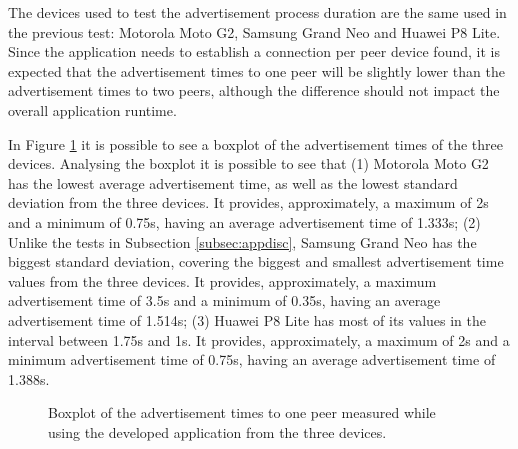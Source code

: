 The devices used to test the advertisement process duration are the same used in the previous test: Motorola Moto G2, Samsung Grand Neo and Huawei P8 Lite. Since the application needs to establish a connection per peer device found, it is expected that the advertisement times to one peer will be slightly lower than the advertisement times to two peers, although the difference should not impact the overall application runtime.

In Figure \ref{fig:adv1} it is possible to see a boxplot of the advertisement times of the three devices. Analysing the boxplot it is possible to see that (1) Motorola Moto G2 has the lowest average advertisement time, as well as the lowest standard deviation from the three devices. It provides, approximately, a maximum of 2s and a minimum of 0.75s, having an average advertisement time of 1.333s; (2) Unlike the tests in Subsection \ref{subsec:appdisc}, Samsung Grand Neo has the biggest standard deviation, covering the biggest and smallest advertisement time values from the three devices. It provides, approximately, a maximum advertisement time of 3.5s and a minimum of 0.35s, having an average advertisement time of 1.514s; (3) Huawei P8 Lite has most of its values in the interval between 1.75s and 1s. It provides, approximately, a maximum of 2s and a minimum advertisement time of 0.75s, having an average advertisement time of 1.388s.

\begin{figure}[ht]
	\noindent{}
	\caption{\label{fig:adv1} Boxplot of the advertisement times to one peer measured while using the developed application from the three devices.}
\end{figure}

